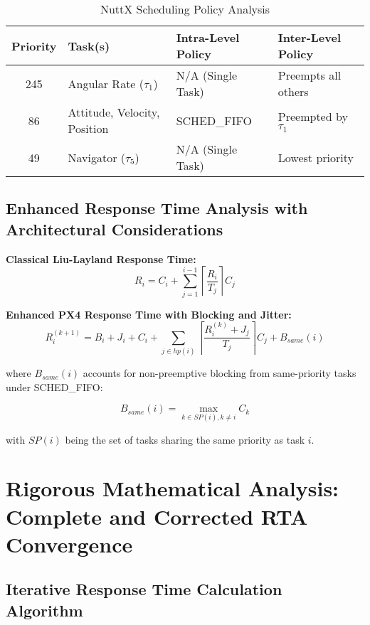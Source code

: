 \documentclass[12pt,a4paper]{article}
\begin{document}
\begin{table}[H]
\centering
\begin{tabular}{|c|l|l|l|}
\hline
\textbf{Priority} & \textbf{Task(s)} & \textbf{Intra-Level Policy} & \textbf{Inter-Level Policy} \\
\hline
245 & Angular Rate ($\tau_1$) & N/A (Single Task) & Preempts all others \\
86 & Attitude, Velocity, Position & SCHED\_FIFO & Preempted by $\tau_1$ \\
49 & Navigator ($\tau_5$) & N/A (Single Task) & Lowest priority \\
\hline
\end{tabular}
\caption{NuttX Scheduling Policy Analysis}
\end{table}

\subsection{Enhanced Response Time Analysis with Architectural Considerations}

\textbf{Classical Liu-Layland Response Time:}
\begin{equation}
R_i = C_i + \sum_{j=1}^{i-1} \left\lceil \frac{R_i}{T_j} \right\rceil C_j
\end{equation}

\textbf{Enhanced PX4 Response Time with Blocking and Jitter:}
\begin{equation}
R_i^{(k+1)} = B_i + J_i + C_i + \sum_{j \in hp(i)} \left\lceil \frac{R_i^{(k)} + J_j}{T_j} \right\rceil C_j + B_{same}(i)
\end{equation}

where $B_{same}(i)$ accounts for non-preemptive blocking from same-priority tasks under SCHED\_FIFO:

\begin{equation}
B_{same}(i) = \max_{k \in SP(i), k \neq i} C_k
\end{equation}

with $SP(i)$ being the set of tasks sharing the same priority as task $i$.

\section{Rigorous Mathematical Analysis: Complete and Corrected RTA Convergence}

\subsection{Iterative Response Time Calculation Algorithm}
\end{document}
